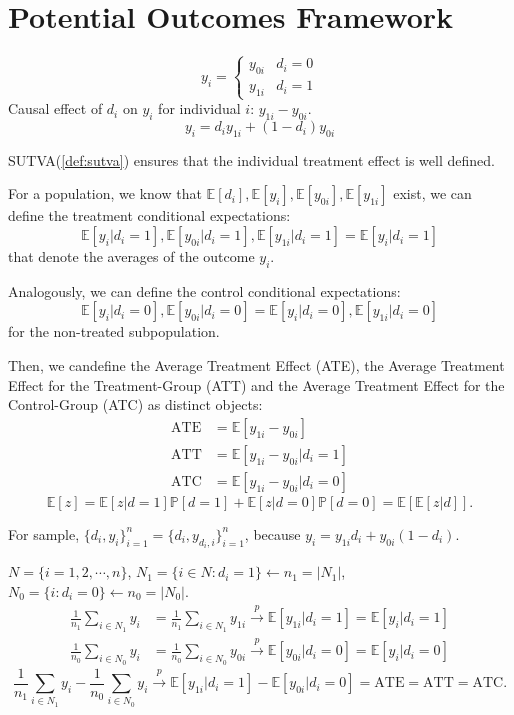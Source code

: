 \section{Potential Outcomes Framework}

\begin{definition}
\label{def:sutva}
  \[y_i = \left\{\begin{matrix}
    y_{0i} & d_i=0\\
    y_{1i} & d_i=1
  \end{matrix} \right.
  \]
  Causal effect of $d_i$ on $y_i$ for individual $i$: $y_{1i} - y_{0i}$.
  \[y_i = d_i y_{1i} + (1-d_i)y_{0i} \]
\end{definition}

SUTVA(\ref{def:sutva}) ensures that the individual treatment effect is well defined.

For a population, we know that $\mathbb{E}[d_i], \mathbb{E}[y_i], \mathbb{E}[y_{0i}], \mathbb{E}[y_{1i}]$ exist,
we can define the treatment conditional expectations:
\[\mathbb{E}[y_i | d_i=1], \mathbb{E}[y_{0i} | d_i=1 ], \mathbb{E}[y_{1i} | d_i=1 ] = \mathbb{E}[y_i | d_i=1]\]
that denote the averages of the outcome $y_i$.

Analogously, we can define the control conditional expectations:
\[\mathbb{E}[y_i | d_i=0], \mathbb{E}[y_{0i} | d_i=0 ] = \mathbb{E}[y_i | d_i=0], \mathbb{E}[y_{1i} | d_i=0 ]\]
for the non-treated subpopulation.

Then, we candefine the Average Treatment Effect (ATE), the Average Treatment Effect for the Treatment-Group (ATT) and the Average
Treatment Effect for the Control-Group (ATC) as distinct objects:
\begin{align*}
  \text{ATE} &= \mathbb{E}[y_{1i}- y_{0i}]\\
  \text{ATT} &= \mathbb{E}[y_{1i}- y_{0i} | d_i=1]\\
  \text{ATC} &= \mathbb{E}[y_{1i}- y_{0i} | d_i=0]
\end{align*}
\[\mathbb{E}[z] = \mathbb{E}[z|d=1] \mathbb{P}[d=1] + \mathbb{E}[z|d=0] \mathbb{P}[d=0] = \mathbb{E}[\mathbb{E}[z|d]].\]

For sample, $\{d_i, y_i\}_{i=1}^n = \{d_i, y_{d_{i}, i}\}_{i=1}^n$, because
$y_i = y_{1i} d_i + y_{0i} (1 - d_i)$.

$N = \{i=1,2,\cdots, n\}$, $N_1 = \{i \in N: d_i = 1\} \leftarrow n_1 = \vert N_1 \vert $, $N_0 = \{i: d_i = 0\} \leftarrow n_0 = \vert N_0 \vert $.
\begin{align*}
  \frac{1}{n_1} \sum_{i \in N_1} y_i &= \frac{1}{n_1} \sum_{i \in N_1} y_{1i} \overset{p}{\rightarrow} \mathbb{E}[y_{1i} | d_i=1] = \mathbb{E}[y_i | d_i=1]\\
  \frac{1}{n_0} \sum_{i \in N_0} y_i &= \frac{1}{n_0} \sum_{i \in N_0} y_{0i} \overset{p}{\rightarrow} \mathbb{E}[y_{0i} | d_i=0] = \mathbb{E}[y_i | d_i=0]
\end{align*}
\[\frac{1}{n_1} \sum_{i \in N_1} y_i - \frac{1}{n_0} \sum_{i \in N_0} y_i \overset{p}{\rightarrow} \mathbb{E}[y_{1i} | d_i = 1] - \mathbb{E}[y_{0i} | d_i = 0] = \text{ATE} = \text{ATT} = \text{ATC}.\]


